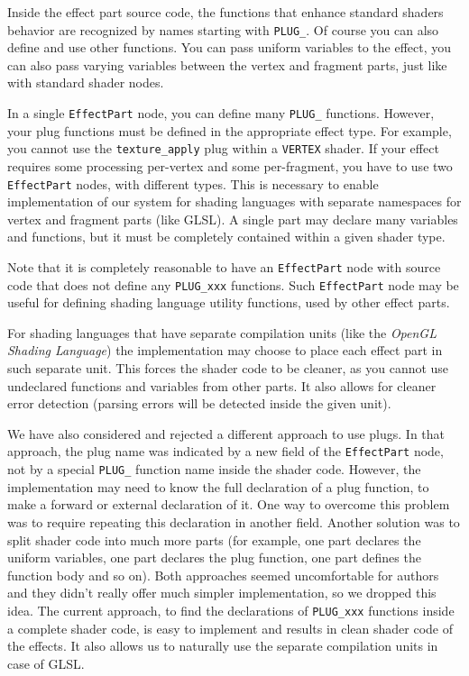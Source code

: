 \documentclass{egpubl}
\begin{document}

Inside the effect part source code, the functions that enhance
standard shaders behavior are recognized by names starting with \texttt{PLUG\_}.
Of course you can also define and use other functions.
You can pass uniform variables to the effect,
you can also pass varying variables between the vertex and fragment
parts, just like with standard shader nodes.

In a single \texttt{EffectPart} node, you can define many \texttt{PLUG\_}
functions. However, your plug functions must be defined in the appropriate
effect type. For example, you cannot use the \texttt{texture\_apply} plug within
a \texttt{VERTEX} shader.
If your effect requires some processing per-vertex and some per-fragment,
you have to use two \texttt{EffectPart} nodes, with different types.
This is necessary to enable implementation of our system for
shading languages with
separate namespaces for vertex and fragment parts (like GLSL).
A single part may declare many variables and functions,
but it must be completely contained within a given shader type.

Note that it is completely reasonable to have an \texttt{EffectPart} node
with source code that does not define any \texttt{PLUG\_xxx} functions.
Such \texttt{EffectPart} node may be useful for defining shading language
utility functions, used by other effect parts.

For shading languages that have separate compilation units
(like the \emph{OpenGL Shading Language}) the implementation may choose to place
each effect part in such separate unit. This forces the shader code to be
cleaner, as you cannot use undeclared functions and variables from other parts.
It also allows for cleaner error detection (parsing errors will be detected
inside the given unit).

We have also considered and rejected a different approach to use plugs.
In that approach, the plug name was indicated by a new field of
the \texttt{EffectPart} node, not by a special \texttt{PLUG\_} function name
inside the shader code.
However, the implementation may need to know the full declaration
of a plug function, to make a forward or external declaration of it.
One way to overcome this problem was to require repeating this declaration
in another field. Another solution was to split shader code into much more
parts (for example, one part declares the uniform variables, one part declares
the plug function, one part defines the function body and so on).
Both approaches seemed uncomfortable for authors
and they didn't really offer much simpler implementation, so we dropped this idea.
The current approach, to find the declarations of \texttt{PLUG\_xxx} functions
inside a complete shader code, is easy to implement and results in clean
shader code of the effects. It also allows us to naturally use
the separate compilation units in case of GLSL.
\end{document}

